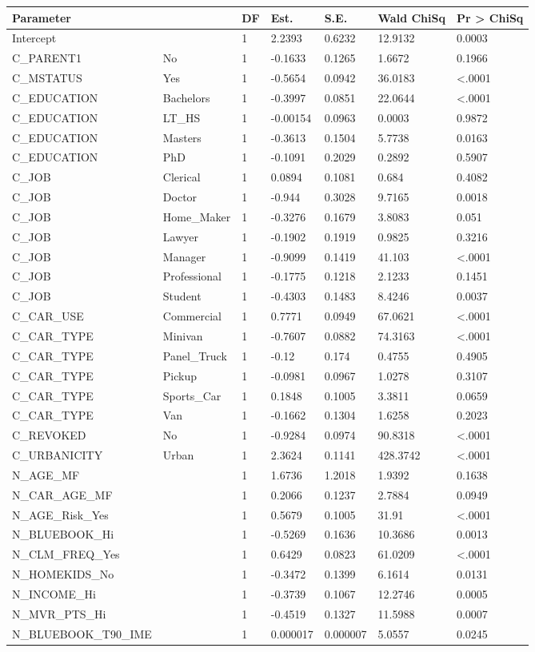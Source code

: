 \documentclass[]{article}
\begin{document}
\begin{longtable}[]{@{}lllllll@{}}
\toprule
Parameter & & DF & Est. & S.E. & Wald ChiSq & Pr \textgreater{}
ChiSq\tabularnewline
\midrule
\endhead
Intercept & & 1 & 2.2393 & 0.6232 & 12.9132 & 0.0003\tabularnewline
C\_PARENT1 & No & 1 & -0.1633 & 0.1265 & 1.6672 & 0.1966\tabularnewline
C\_MSTATUS & Yes & 1 & -0.5654 & 0.0942 & 36.0183 &
\textless{}.0001\tabularnewline
C\_EDUCATION & Bachelors & 1 & -0.3997 & 0.0851 & 22.0644 &
\textless{}.0001\tabularnewline
C\_EDUCATION & LT\_HS & 1 & -0.00154 & 0.0963 & 0.0003 &
0.9872\tabularnewline
C\_EDUCATION & Masters & 1 & -0.3613 & 0.1504 & 5.7738 &
0.0163\tabularnewline
C\_EDUCATION & PhD & 1 & -0.1091 & 0.2029 & 0.2892 &
0.5907\tabularnewline
C\_JOB & Clerical & 1 & 0.0894 & 0.1081 & 0.684 & 0.4082\tabularnewline
C\_JOB & Doctor & 1 & -0.944 & 0.3028 & 9.7165 & 0.0018\tabularnewline
C\_JOB & Home\_Maker & 1 & -0.3276 & 0.1679 & 3.8083 &
0.051\tabularnewline
C\_JOB & Lawyer & 1 & -0.1902 & 0.1919 & 0.9825 & 0.3216\tabularnewline
C\_JOB & Manager & 1 & -0.9099 & 0.1419 & 41.103 &
\textless{}.0001\tabularnewline
C\_JOB & Professional & 1 & -0.1775 & 0.1218 & 2.1233 &
0.1451\tabularnewline
C\_JOB & Student & 1 & -0.4303 & 0.1483 & 8.4246 & 0.0037\tabularnewline
C\_CAR\_USE & Commercial & 1 & 0.7771 & 0.0949 & 67.0621 &
\textless{}.0001\tabularnewline
C\_CAR\_TYPE & Minivan & 1 & -0.7607 & 0.0882 & 74.3163 &
\textless{}.0001\tabularnewline
C\_CAR\_TYPE & Panel\_Truck & 1 & -0.12 & 0.174 & 0.4755 &
0.4905\tabularnewline
C\_CAR\_TYPE & Pickup & 1 & -0.0981 & 0.0967 & 1.0278 &
0.3107\tabularnewline
C\_CAR\_TYPE & Sports\_Car & 1 & 0.1848 & 0.1005 & 3.3811 &
0.0659\tabularnewline
C\_CAR\_TYPE & Van & 1 & -0.1662 & 0.1304 & 1.6258 &
0.2023\tabularnewline
C\_REVOKED & No & 1 & -0.9284 & 0.0974 & 90.8318 &
\textless{}.0001\tabularnewline
C\_URBANICITY & Urban & 1 & 2.3624 & 0.1141 & 428.3742 &
\textless{}.0001\tabularnewline
N\_AGE\_MF & & 1 & 1.6736 & 1.2018 & 1.9392 & 0.1638\tabularnewline
N\_CAR\_AGE\_MF & & 1 & 0.2066 & 0.1237 & 2.7884 & 0.0949\tabularnewline
N\_AGE\_Risk\_Yes & & 1 & 0.5679 & 0.1005 & 31.91 &
\textless{}.0001\tabularnewline
N\_BLUEBOOK\_Hi & & 1 & -0.5269 & 0.1636 & 10.3686 &
0.0013\tabularnewline
N\_CLM\_FREQ\_Yes & & 1 & 0.6429 & 0.0823 & 61.0209 &
\textless{}.0001\tabularnewline
N\_HOMEKIDS\_No & & 1 & -0.3472 & 0.1399 & 6.1614 &
0.0131\tabularnewline
N\_INCOME\_Hi & & 1 & -0.3739 & 0.1067 & 12.2746 & 0.0005\tabularnewline
N\_MVR\_PTS\_Hi & & 1 & -0.4519 & 0.1327 & 11.5988 &
0.0007\tabularnewline
N\_BLUEBOOK\_T90\_IME & & 1 & 0.000017 & 0.000007 & 5.0557 &
0.0245\tabularnewline

\end{longtable}
\end{document}

